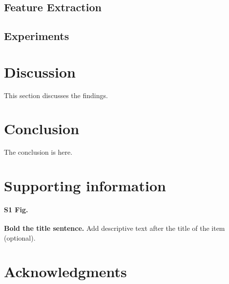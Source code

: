 \documentclass[10pt,letterpaper]{article}
\begin{document}
\subsection*{Feature Extraction}

\subsection*{Experiments}


\section*{Discussion}

This section discusses the findings.

\section*{Conclusion}

The conclusion is here. 

\section*{Supporting information}

\paragraph*{S1 Fig.}
\label{S1_Fig}
{\bf Bold the title sentence.} Add descriptive text after the title of the item (optional).

\section*{Acknowledgments}

\nolinenumbers


\end{document}
